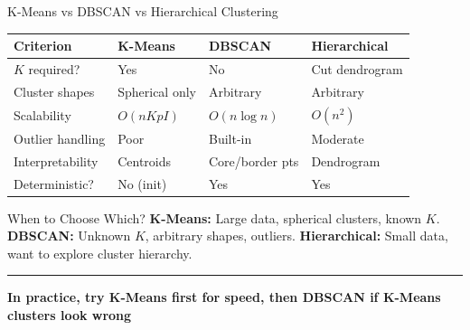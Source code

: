 \documentclass[8pt,aspectratio=169]{beamer}
\newcommand{\bottomnote}[1]{%
\vfill
\vspace{-2mm}
\textcolor{mllavender2}{\rule{\textwidth}{0.4pt}}
\vspace{1mm}
\footnotesize
\textbf{#1}
}
\begin{document}
\begin{frame}[t]{K-Means vs DBSCAN vs Hierarchical Clustering}
\small
\vspace{1mm}
\footnotesize
\begin{tabular}{llll}
\toprule
\textbf{Criterion} & \textbf{K-Means} & \textbf{DBSCAN} & \textbf{Hierarchical} \\
\midrule
$K$ required? & \textcolor{mlred}{Yes} & \textcolor{mlgreen}{No} & Cut dendrogram \\
Cluster shapes & Spherical only & \textcolor{mlgreen}{Arbitrary} & Arbitrary \\
Scalability & \textcolor{mlgreen}{$O(nKpI)$} & $O(n \log n)$ & \textcolor{mlred}{$O(n^2)$} \\
Outlier handling & \textcolor{mlred}{Poor} & \textcolor{mlgreen}{Built-in} & Moderate \\
Interpretability & Centroids & Core/border pts & Dendrogram \\
Deterministic? & No (init) & \textcolor{mlgreen}{Yes} & \textcolor{mlgreen}{Yes} \\
\bottomrule
\end{tabular}

\vspace{3mm}
\begin{block}{When to Choose Which?}
\footnotesize
\textbf{K-Means:} Large data, spherical clusters, known $K$. \quad
\textbf{DBSCAN:} Unknown $K$, arbitrary shapes, outliers. \quad
\textbf{Hierarchical:} Small data, want to explore cluster hierarchy.
\end{block}
\bottomnote{In practice, try K-Means first for speed, then DBSCAN if K-Means clusters look wrong}
\end{frame}
\end{document}
